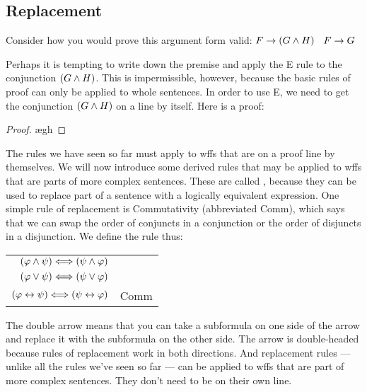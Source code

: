 \iffalse

\subsection{Replacement}

Consider how you would prove this argument form valid: $F\rightarrow(G\wedge H)$ \therefore\ $F\rightarrow G$

Perhaps it is tempting to write down the premise and apply the {\eand}E rule to the conjunction $(G \wedge H)$. This is impermissible, however, because the basic rules of proof can only be applied to whole sentences. In order to use {\eand}E, we need to get the conjunction $(G \wedge H)$ on a line by itself. Here is a proof:

\begin{proof}
	 \pr{}
	\open
		\ae{gh}
	\close
\end{proof}

The rules we have seen so far must apply to wffs that are on a proof line by themselves. We will now introduce some derived rules that may be applied to wffs that are parts of more complex sentences. These are called , because they can be used to replace part of a sentence with a logically equivalent expression. One simple rule of replacement is Commutativity (abbreviated Comm), which says that we can swap the order of conjuncts in a conjunction or the order of disjuncts in a disjunction. We define the rule thus:

\begin{center}
\begin{tabular}{rl}
$(\varphi{}\wedge\psi{}) \Longleftrightarrow (\psi{}\wedge\varphi{})$\\
$(\varphi{}\vee\psi{}) \Longleftrightarrow (\psi{}\vee\varphi{})$\\
$(\varphi{}\leftrightarrow\psi{}) \Longleftrightarrow (\psi{}\leftrightarrow\varphi{})$
& Comm
\end{tabular}
\end{center}

The double arrow means that you can take a subformula on one side of the arrow and replace it with the subformula on the other side. The arrow is double-headed because rules of replacement work in both directions. And replacement rules --- unlike all the rules we've seen so far --- can be applied to wffs that are part of more complex sentences. They don't need to be on their own line.

